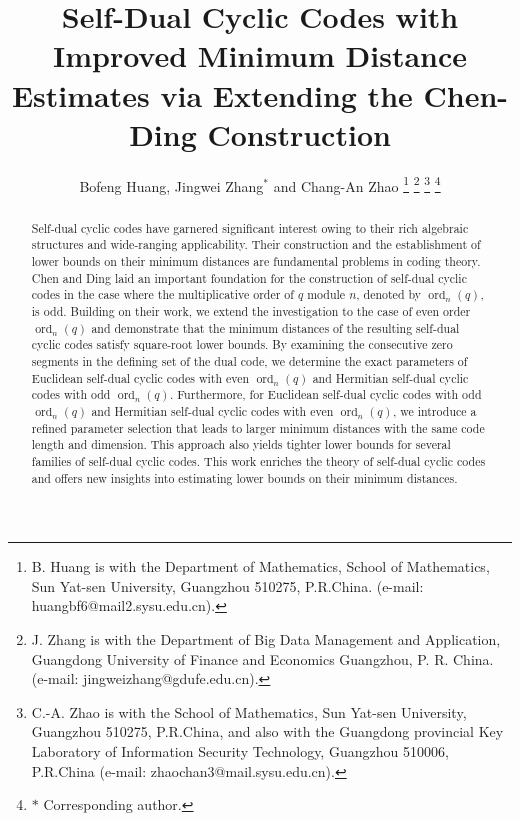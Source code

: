 \documentclass[journal,12pt,onecolumn]{IEEEtran}
\begin{document}
    

\title{Self-Dual Cyclic Codes with Improved Minimum Distance Estimates via Extending the Chen-Ding Construction}

\author{Bofeng Huang, Jingwei Zhang$^*$
 and Chang-An Zhao
\thanks{B. Huang is with the Department of Mathematics, School of Mathematics, Sun Yat-sen University, Guangzhou 510275, P.R.China. (e-mail: huangbf6@mail2.sysu.edu.cn).}
\thanks{J. Zhang is with the
 Department of Big Data Management and Application, 
 Guangdong University of Finance and Economics
 Guangzhou, P. R. China. (e-mail: jingweizhang@gdufe.edu.cn).}
\thanks{C.-A. Zhao is with the School of Mathematics, Sun Yat-sen University, Guangzhou 510275, P.R.China, and also with the Guangdong provincial Key Laboratory of Information Security Technology, Guangzhou 510006, P.R.China (e-mail: zhaochan3@mail.sysu.edu.cn).}
\thanks{$*$ Corresponding author.}
 }






\maketitle

\begin{abstract}
Self-dual cyclic codes have garnered significant interest owing to their rich algebraic structures and wide-ranging applicability. Their construction and the establishment of lower bounds on their minimum distances are fundamental problems in coding theory. Chen and Ding laid an important foundation for the construction of self-dual cyclic codes in the case where the multiplicative order of $q$ module $n$, denoted by $\operatorname{ord}_n(q)$, is odd. Building on their work, we extend the investigation to the case of even order $\operatorname{ord}_n(q)$ and demonstrate that the minimum distances of the resulting self-dual cyclic codes satisfy square-root lower bounds. By examining the consecutive zero segments in the defining set of the dual code, we determine the exact parameters of Euclidean self-dual cyclic codes with even $\operatorname{ord}_n(q)$ and Hermitian self-dual cyclic codes with odd $\operatorname{ord}_n(q)$. Furthermore, for Euclidean self-dual cyclic codes with odd $\operatorname{ord}_n(q)$ and Hermitian self-dual cyclic codes with even $\operatorname{ord}_n(q)$, we introduce a refined parameter selection that leads to larger minimum distances with the same code length and dimension. This approach also yields tighter lower bounds for several families of self-dual cyclic codes. This work enriches the theory of self-dual cyclic codes and offers new insights into estimating lower bounds on their minimum distances.
\end{abstract}
\end{document}
